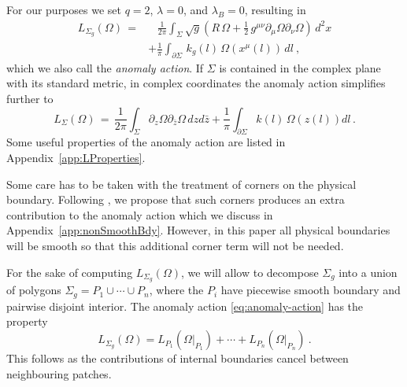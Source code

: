 \documentclass[11pt,a4paper]{article}
\numberwithin{equation}{section}
\begin{document}
For our purposes we set $q=2$, $\lambda = 0$, and $\lambda_B = 0$, resulting in 
%
\begin{equation}\label{eq:anomaly-action}
\begin{split}
    L_{\Sigma_g}(\Omega) \,= &~~~\,\frac{1}{2\pi} \int_\Sigma \sqrt{g} \left( R\, \Omega + \frac12 \, g^{\mu\nu}\partial_\mu\Omega \partial_\nu \Omega  \right)\,d^2x\\
    &+ \frac{1}{\pi} \int_{\partial\Sigma} \,k_g(l)\, \Omega\!\left(x^\mu(l)\right)\, dl \ ,
\end{split}
\end{equation}
%
which we also call the \emph{anomaly action}. If $\Sigma$ is contained in the complex plane with its standard metric, in complex coordinates the anomaly action simplifies further to 
%
%
%
%
%
%
%
%
\begin{equation}
    L_\Sigma(\Omega) \,=\, \frac{1}{2\pi} \int_\Sigma  \partial_z\Omega \partial_{\bar{z}} \Omega \,dzd\bar{z}+ \frac{1}{\pi} \int_{\partial\Sigma} k(l)\, \Omega\!\left(z(l)\right) dl \,.
\end{equation}
Some useful properties of the anomaly action are listed in Appendix~\ref{app:LProperties}.

Some care has to be taken with the treatment of corners on the physical boundary. Following \cite{Cardy:1988tk}, we propose that such corners produces an extra contribution to the anomaly action which we discuss in Appendix~\ref{app:nonSmoothBdy}. However, in this paper all physical boundaries will be smooth so that this additional corner term will not be needed.

\smallskip

For the sake of computing $L_{\Sigma_g}(\Omega)$, we will allow to decompose $\Sigma_g$ into a union of polygons $\Sigma_g = P_1 \cup \cdots \cup P_n$, where the $P_i$ have piecewise smooth boundary and pairwise disjoint interior. 
The anomaly action \eqref{eq:anomaly-action} has the property 
\begin{equation}\label{eq:anomaly-sum-patches}
    L_{\Sigma_g}(\Omega) = L_{P_1}(\Omega|_{P_1}) + \cdots + L_{P_n}(\Omega|_{P_n})  \ .
\end{equation}
This follows as the contributions of internal boundaries cancel between neighbouring patches.
\end{document}

